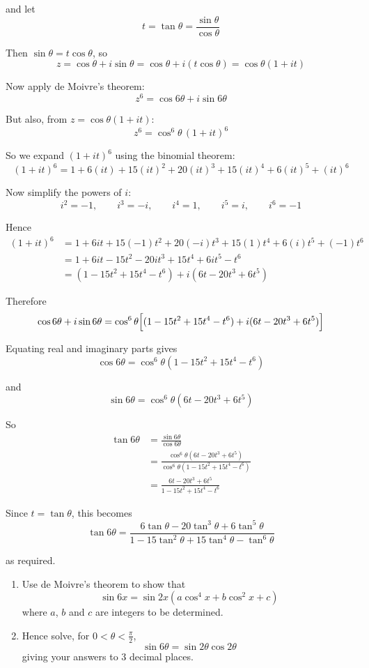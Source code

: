 \documentclass[leqno]{article}
\begin{document}
\begin{enumerate}[
  label=\textbf{\arabic*.},
  leftmargin=*,
  topsep=0pt,
  partopsep=0pt,
  parsep=0pt
]
\begin{djsSolution}
and let
\[
t=\tan\theta=\frac{\sin\theta}{\cos\theta}
\]

Then \(\sin\theta=t\cos\theta\), so
\[
z=\cos\theta+i\sin\theta=\cos\theta+i(t\cos\theta)=\cos\theta(1+it)
\]

Now apply de Moivre's theorem:
\[
z^6=\cos 6\theta+i\sin 6\theta
\]

But also, from \(z=\cos\theta(1+it)\):
\[
z^6=\cos^6\theta\,(1+it)^6
\]

So we expand \((1+it)^6\) using the binomial theorem:
\[
(1+it)^6
=1+6(it)+15(it)^2+20(it)^3+15(it)^4+6(it)^5+(it)^6
\]

Now simplify the powers of \(i\):
\[
i^2=-1,\qquad i^3=-i,\qquad i^4=1,\qquad i^5=i,\qquad i^6=-1
\]

Hence
\begin{align*}
(1+it)^6
&=1+6it+15(-1)t^2+20(-i)t^3+15(1)t^4+6(i)t^5+(-1)t^6 \\
&=1+6it-15t^2-20it^3+15t^4+6it^5-t^6 \\
&=(1-15t^2+15t^4-t^6)+i(6t-20t^3+6t^5)
\end{align*}

Therefore
\[
\cos 6\theta+i\sin 6\theta=\cos^6\theta\Bigl[(1-15t^2+15t^4-t^6)+i(6t-20t^3+6t^5)\Bigr]
\]

Equating real and imaginary parts gives
\[
\cos 6\theta=\cos^6\theta(1-15t^2+15t^4-t^6)
\]

and
\[
\sin 6\theta=\cos^6\theta(6t-20t^3+6t^5)
\]

So
\begin{align*}
\tan 6\theta
&=\frac{\sin 6\theta}{\cos 6\theta} \\
&=\frac{\cos^6\theta(6t-20t^3+6t^5)}{\cos^6\theta(1-15t^2+15t^4-t^6)} \\
&=\frac{6t-20t^3+6t^5}{1-15t^2+15t^4-t^6}
\end{align*}

Since \(t=\tan\theta\), this becomes
\[
\tan 6\theta=\frac{6\tan\theta-20\tan^3\theta+6\tan^5\theta}{1-15\tan^2\theta+15\tan^4\theta-\tan^6\theta}
\]

as required.
\end{djsSolution}


\newpage

\questionitem

\begin{enumerate}[label=\textbf{(\alph*)}]
  \item Use de Moivre's theorem to show that
  \[
  \sin 6x = \sin 2x\left(a\cos^4 x + b\cos^2 x + c\right)
  \]
  where $a$, $b$ and $c$ are integers to be determined.  \\
  \item Hence solve, for $0<\theta<\frac{\pi}{2}$,
  \[
  \sin 6\theta = \sin 2\theta \cos 2\theta
  \]
  giving your answers to $3$ decimal places.  \\
\end{enumerate}


\end{enumerate}
\end{document}
